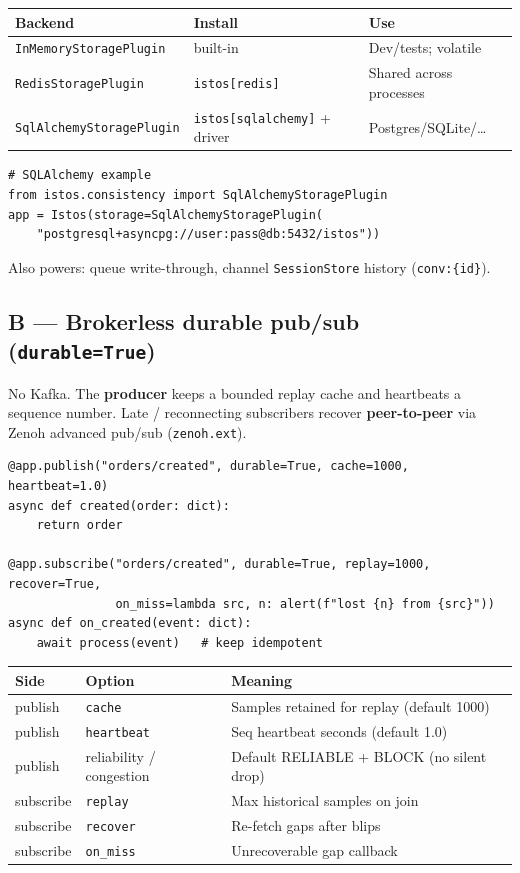 \documentclass[11pt,a4paper]{article}
\begin{document}
\begin{center}
\begin{tabular}{@{}lll@{}}
\toprule
Backend & Install & Use \\
\midrule
\texttt{InMemoryStoragePlugin} & built-in & Dev/tests; volatile \\
\texttt{RedisStoragePlugin} & \texttt{istos[redis]} & Shared across processes \\
\texttt{SqlAlchemyStoragePlugin} & \texttt{istos[sqlalchemy]} + driver & Postgres/SQLite/\ldots \\
\bottomrule
\end{tabular}
\end{center}

\begin{lstlisting}
# SQLAlchemy example
from istos.consistency import SqlAlchemyStoragePlugin
app = Istos(storage=SqlAlchemyStoragePlugin(
    "postgresql+asyncpg://user:pass@db:5432/istos"))
\end{lstlisting}

Also powers: queue write-through, channel \texttt{SessionStore} history
(\texttt{conv:\{id\}}).

\subsection{B --- Brokerless durable pub/sub (\texttt{durable=True})}

No Kafka. The \textbf{producer} keeps a bounded replay cache and heartbeats a
sequence number. Late / reconnecting subscribers recover \textbf{peer-to-peer}
via Zenoh advanced pub/sub (\texttt{zenoh.ext}).

\begin{lstlisting}
@app.publish("orders/created", durable=True, cache=1000, heartbeat=1.0)
async def created(order: dict):
    return order

@app.subscribe("orders/created", durable=True, replay=1000, recover=True,
               on_miss=lambda src, n: alert(f"lost {n} from {src}"))
async def on_created(event: dict):
    await process(event)   # keep idempotent
\end{lstlisting}

\begin{center}
\begin{tabular}{@{}lll@{}}
\toprule
Side & Option & Meaning \\
\midrule
publish & \texttt{cache} & Samples retained for replay (default 1000) \\
publish & \texttt{heartbeat} & Seq heartbeat seconds (default 1.0) \\
publish & reliability / congestion & Default RELIABLE + BLOCK (no silent drop) \\
subscribe & \texttt{replay} & Max historical samples on join \\
subscribe & \texttt{recover} & Re-fetch gaps after blips \\
subscribe & \texttt{on\_miss} & Unrecoverable gap callback \\
\bottomrule
\end{tabular}
\end{center}
\end{document}
